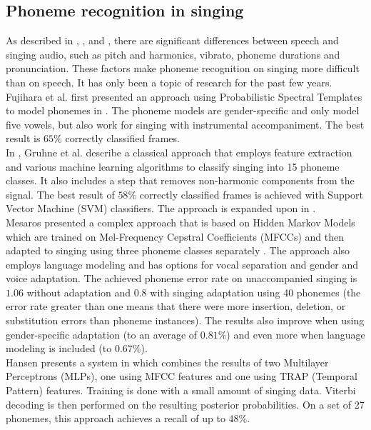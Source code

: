 \subsection{Phoneme recognition in singing}
As described in \cite{loscos}, \cite{goto_alignment}, and \cite{kruspe_kws1}, there are significant differences between speech and singing audio, such as pitch and harmonics, vibrato, phoneme durations and pronunciation. These factors make phoneme recognition on singing more difficult than on speech. It has only been a topic of research for the past few years. \\
Fujihara et al. first presented an approach using Probabilistic Spectral Templates to model phonemes in \cite{fujihara_phonemes}. The phoneme models are gender-specific and only model five vowels, but also work for singing with instrumental accompaniment. The best result is $65\%$ correctly classified frames. \\
In \cite{gruhne}, Gruhne et al. describe a classical approach that employs feature extraction and various machine learning algorithms to classify singing into 15 phoneme classes. It also includes a step that removes non-harmonic components from the signal. The best result of $58\%$ correctly classified frames is achieved with Support Vector Machine (SVM) classifiers. The approach is expanded upon in \cite{szepannek}. \\
Mesaros presented a complex approach that is based on Hidden Markov Models which are trained on Mel-Frequency Cepstral Coefficients (MFCCs) and then adapted to singing using three phoneme classes separately \cite{mesaros1}\cite{mesaros2}. The approach also employs language modeling and has options for vocal separation and gender and voice adaptation. The achieved phoneme error rate on unaccompanied singing is $1.06$ without adaptation and $0.8$ with singing adaptation using 40 phonemes (the error rate greater than one means that there were more insertion, deletion, or substitution errors than phoneme instances). The results also improve when using gender-specific adaptation (to an average of $0.81\%$) and even more when language modeling is included (to $0.67\%$). \\
Hansen presents a system in \cite{jens} which combines the results of two Multilayer Perceptrons (MLPs), one using MFCC features and one using TRAP (Temporal Pattern) features. Training is done with a small amount of singing data. Viterbi decoding is then performed on the resulting posterior probabilities. On a set of 27 phonemes, this approach achieves a recall of up to $48\%$.

